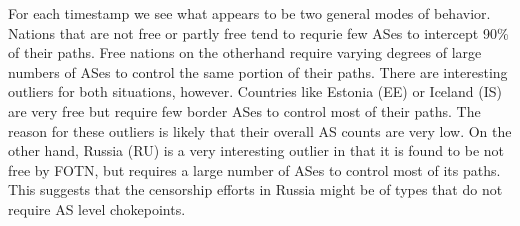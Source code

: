 \par
For each timestamp we see what appears to be two general modes of behavior. Nations that are not free or partly free tend to requrie few ASes
to intercept 90\% of their paths. Free nations on the otherhand require varying degrees of large numbers of ASes to control the same portion
of their paths. There are interesting outliers for both situations, however. Countries like Estonia (EE) or Iceland (IS) are very free but require
few border ASes to control most of their paths. The reason for these outliers is likely that their overall AS counts are very low. On the other hand, Russia (RU)
is a very interesting outlier in that it is found to be not free by FOTN, but requires a large number of ASes to control most of its paths. This suggests
that the censorship efforts in Russia might be of types that do not require AS level chokepoints.
